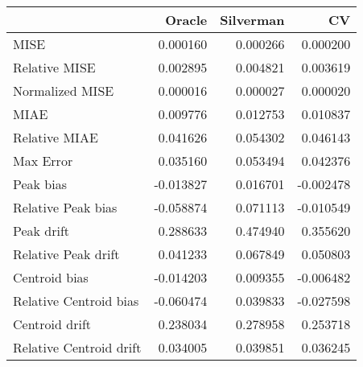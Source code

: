 \begin{tabular}{lrrr}
  \hline
 & Oracle & Silverman & CV \\ 
  \hline
MISE & 0.000160 & 0.000266 & 0.000200 \\ 
  Relative MISE & 0.002895 & 0.004821 & 0.003619 \\ 
  Normalized MISE & 0.000016 & 0.000027 & 0.000020 \\ 
  MIAE & 0.009776 & 0.012753 & 0.010837 \\ 
  Relative MIAE & 0.041626 & 0.054302 & 0.046143 \\ 
  Max Error & 0.035160 & 0.053494 & 0.042376 \\ 
  Peak bias & -0.013827 & 0.016701 & -0.002478 \\ 
  Relative Peak bias & -0.058874 & 0.071113 & -0.010549 \\ 
  Peak drift & 0.288633 & 0.474940 & 0.355620 \\ 
  Relative Peak drift & 0.041233 & 0.067849 & 0.050803 \\ 
  Centroid bias & -0.014203 & 0.009355 & -0.006482 \\ 
  Relative Centroid bias & -0.060474 & 0.039833 & -0.027598 \\ 
  Centroid drift & 0.238034 & 0.278958 & 0.253718 \\ 
  Relative Centroid drift & 0.034005 & 0.039851 & 0.036245 \\ 
   \hline
\end{tabular}
